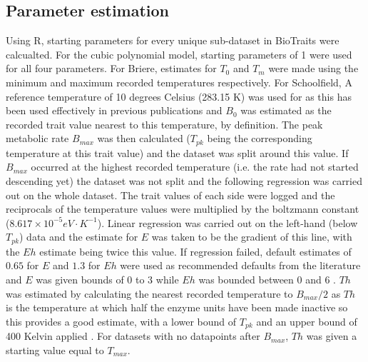 \documentclass[twoside,twocolumn]{article}
\begin{document}
\subsection{Parameter estimation}
Using R, starting parameters for every unique sub-dataset in BioTraits were calcualted.
For the cubic polynomial model, starting parameters of 1 were used for all four parameters.
For Briere, estimates for $T_{0}$ and $T_{m}$ were made using
the minimum and maximum recorded temperatures respectively. For Schoolfield, A reference temperature of 10 
degrees Celsius (283.15 K) was used for as this has been used effectively in previous publications \citep{Dell2011} and $B_{0}$ 
was estimated as the recorded trait value nearest to this temperature, by definition. The peak metabolic rate $B_{max}$ was then
calculated ($T_{pk}$ being the corresponding temperature at this trait value) and the dataset was split around this value. If $B_{max}$ occurred at the highest recorded temperature 
(i.e. the rate had not started descending yet) the dataset was not split and the following regression was carried 
out on the whole dataset. The trait values of each side were logged and the reciprocals
of the temperature values were multiplied by the boltzmann constant ($8.617 \times 10^{-5} eV \cdot K^{-1}$). Linear 
regression was carried out on the left-hand (below $T_{pk}$) data and the estimate for $E$ was taken to be the gradient
of this line, with the $Eh$ estimate being twice this value. If regression failed, default estimates of $0.65$ for $E$
and $1.3$ for $Eh$ were used as recommended defaults from the literature and $E$ was given bounds of 0 to 3 while $Eh$ was bounded between
0 and 6 \citep{Montoya2012, Dell2011}. $Th$ was estimated by 
calculating the nearest recorded temperature to $B_{max} / 2$ as $Th$ is the temperature at which half the enzyme 
units have been made inactive so this provides a good estimate, with a lower bound of $T_{pk}$ and an upper bound of 400 Kelvin applied 
\citep{Sal2018}. For datasets with no datapoints after $B_{max}$, $Th$ was given a starting value equal to $T_{max}$. 
\end{document}
